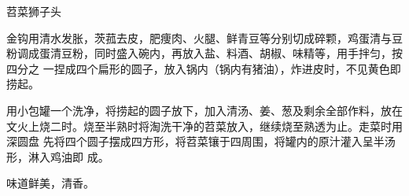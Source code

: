 %
%
%
%
%
%
%
\begin{recipe}{苕菜狮子头}

\ingredients


\preparation

\step 金钩用清水发胀，茨菰去皮，肥痩肉、火腿、鲜青豆等分别切成碎颗，鸡蛋清与豆
粉调成蛋清豆粉，同时盛入碗内，再放入盐、料酒、胡椒、味精等，用手拌匀，按四分之
一捏成四个扁形的圆子，放入锅内（锅内有猪油），炸进皮时，不见黄色即捞起。

\step 用小包罐一个洗净，将捞起的圆子放下，加入清汤、姜、葱及剩余全部作料，放在
文火上烧二时。烧至半熟时将淘洗干净的苕菜放入，继续烧至熟透为止。走菜时用深圆盘
先将四个圆子摆成四方形，将苕菜镶于四周围，将罐内的原汁灌入呈半汤形，淋入鸡油即
成。

\features

味道鲜美，清香。

\end{recipe}

